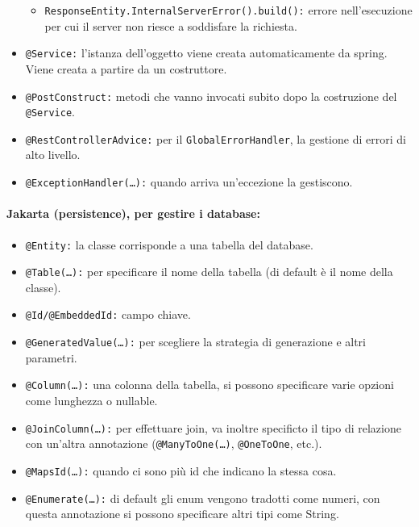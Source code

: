 \begin{itemize}
\begin{itemize}
		      \item \texttt{ResponseEntity.InternalServerError().build():} errore nell'esecuzione per cui il server non riesce a soddisfare la richiesta.
	      \end{itemize}
	\item \texttt{@Service:} l'istanza dell'oggetto viene creata automaticamente da spring. Viene creata a partire da un costruttore.
	\item \texttt{@PostConstruct:} metodi che vanno invocati subito dopo la costruzione del \texttt{@Service}.
	\item \texttt{@RestControllerAdvice:} per il \texttt{GlobalErrorHandler}, la gestione di errori di alto livello.
	\item \texttt{@ExceptionHandler(\dots):} quando arriva un'eccezione la gestiscono.
\end{itemize}

\paragraph{Jakarta (persistence), per gestire i database:}

\begin{itemize}
	\item \texttt{@Entity:} la classe corrisponde a una tabella del database.
	\item \texttt{@Table(\dots):} per specificare il nome della tabella (di default è il nome della classe).
	\item \texttt{@Id/@EmbeddedId:} campo chiave.
	\item \texttt{@GeneratedValue(\dots):} per scegliere la strategia di generazione e altri parametri.
	\item \texttt{@Column(\dots):} una colonna della tabella, si possono specificare varie opzioni come lunghezza o nullable.
	\item \texttt{@JoinColumn(\dots):} per effettuare join, va inoltre specificto il tipo di relazione con un'altra annotazione (\texttt{@ManyToOne(\dots)}, \texttt{@OneToOne}, etc.).
	\item \texttt{@MapsId(\dots):} quando ci sono più id che indicano la stessa cosa.
	\item \texttt{@Enumerate(\dots):} di default gli enum vengono tradotti come numeri, con questa annotazione si possono specificare altri tipi come String.
\end{itemize}


